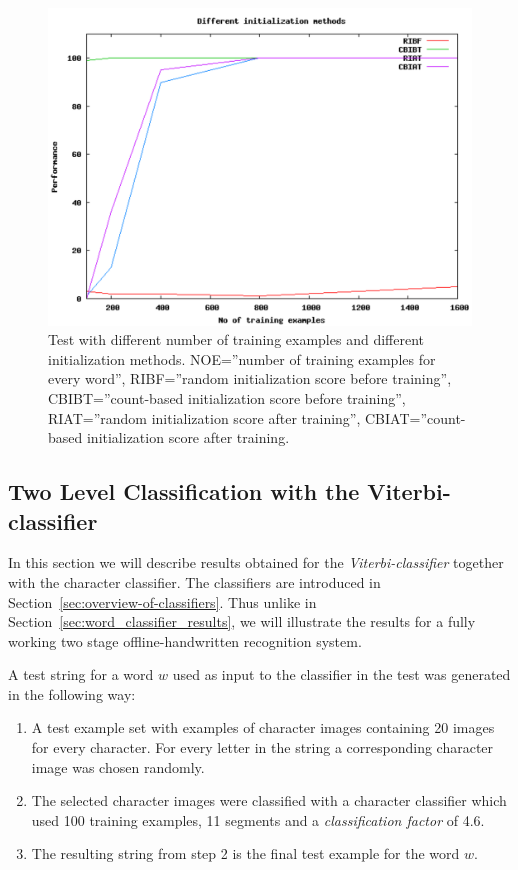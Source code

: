 \begin{figure}[h!]
\centering
\includegraphics[scale=0.57]{initialization-methods}
\caption{Test with different number of training examples and different initialization methods.
	 NOE=''number of training examples for every word'',
         RIBF=''random initialization score before training'',
         CBIBT=''count-based initialization score before training'',
         RIAT=''random initialization score after training'',
         CBIAT=''count-based initialization score after training.}
\label{figure:initialization-methods}
\end{figure}

\subsection{Two Level Classification with the Viterbi-classifier}
In this section we will describe results obtained for the \emph{Viterbi-classifier} together with the character classifier.
The classifiers are introduced in Section~\ref{sec:overview-of-classifiers}.
Thus unlike in Section~\ref{sec:word_classifier_results},  we will illustrate the results for a fully working two stage offline-handwritten recognition system.


A test string for a word $w$ used as input to the classifier in the test was generated in the following way:

\begin{enumerate}
 \item A test example set with examples of character images containing 20 images for every character. 
For every letter in the string a corresponding character image was chosen randomly.
 \item The selected character images were classified with a character classifier which used 100 training examples, 11 segments and a \textit{classification factor} of 4.6.
 \item The resulting string from step 2 is the final test example for the word $w$.
\end{enumerate}


